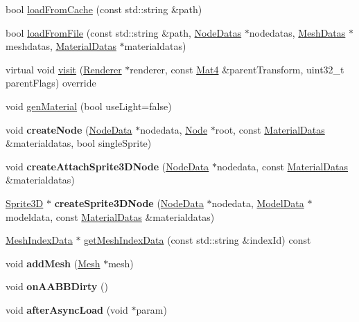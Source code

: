 \begin{DoxyCompactItemize}
\item 
bool \hyperlink{classSprite3D_aeeec351e43e4ccc2d1782bb7652db960}{load\+From\+Cache} (const std\+::string \&path)
\item 
bool \hyperlink{classSprite3D_a4927dfcc1a6cd4a2e7429b501da0d10d}{load\+From\+File} (const std\+::string \&path, \hyperlink{structNodeDatas}{Node\+Datas} $\ast$nodedatas, \hyperlink{structMeshDatas}{Mesh\+Datas} $\ast$meshdatas, \hyperlink{structMaterialDatas}{Material\+Datas} $\ast$materialdatas)
\item 
virtual void \hyperlink{classSprite3D_a7c6db1d1a851a0a1d2ca17f4c9ad8c67}{visit} (\hyperlink{classRenderer}{Renderer} $\ast$renderer, const \hyperlink{classMat4}{Mat4} \&parent\+Transform, uint32\+\_\+t parent\+Flags) override
\item 
void \hyperlink{classSprite3D_ac5fc3ddd4aef194a08a1a1285292b329}{gen\+Material} (bool use\+Light=false)
\item 
\mbox{\label{classSprite3D_ae3de6963a2053930d87093e892e489e0}} 
void {\bfseries create\+Node} (\hyperlink{structNodeData}{Node\+Data} $\ast$nodedata, \hyperlink{classNode}{Node} $\ast$root, const \hyperlink{structMaterialDatas}{Material\+Datas} \&materialdatas, bool single\+Sprite)
\item 
\mbox{\label{classSprite3D_a468eb0eb1866db74ba071d37e7e02389}} 
void {\bfseries create\+Attach\+Sprite3\+D\+Node} (\hyperlink{structNodeData}{Node\+Data} $\ast$nodedata, const \hyperlink{structMaterialDatas}{Material\+Datas} \&materialdatas)
\item 
\mbox{\label{classSprite3D_a62f9f873652333fb22ad9314f80fdd8d}} 
\hyperlink{classSprite3D}{Sprite3D} $\ast$ {\bfseries create\+Sprite3\+D\+Node} (\hyperlink{structNodeData}{Node\+Data} $\ast$nodedata, \hyperlink{structModelData}{Model\+Data} $\ast$modeldata, const \hyperlink{structMaterialDatas}{Material\+Datas} \&materialdatas)
\item 
\hyperlink{classMeshIndexData}{Mesh\+Index\+Data} $\ast$ \hyperlink{classSprite3D_ab02c08862094a11914bd416751244f36}{get\+Mesh\+Index\+Data} (const std\+::string \&index\+Id) const
\item 
\mbox{\label{classSprite3D_aa0913954dfa85ef5ef15aaf30ce3b54f}} 
void {\bfseries add\+Mesh} (\hyperlink{classMesh}{Mesh} $\ast$mesh)
\item 
\mbox{\label{classSprite3D_a4c88e570782521866b678e1ef11a4056}} 
void {\bfseries on\+A\+A\+B\+B\+Dirty} ()
\item 
\mbox{\label{classSprite3D_aa57b9816873f80ce96644e1adcfbf747}} 
void {\bfseries after\+Async\+Load} (void $\ast$param)
\end{DoxyCompactItemize}

